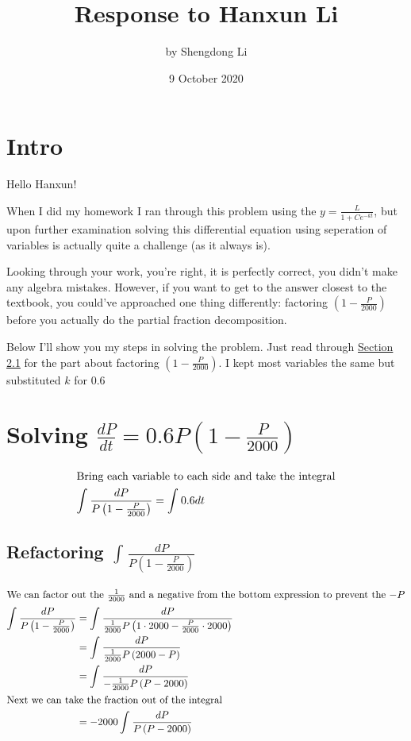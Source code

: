 \documentclass[12pt]{article}
\begin{document}
\title{Response to Hanxun Li}
\author{by Shengdong Li}
\date{9 October 2020}
\maketitle

\section{Intro}
Hello Hanxun!

When I did my homework I ran through this problem using the $y=\frac{L}{1+Ce^{-kt}}$, but upon further examination solving this differential equation using seperation of variables is actually quite a challenge (as it always is).

Looking through your work, you're right, it is perfectly correct, you didn't make any algebra mistakes. However, if you want to get to the answer closest to the textbook, you could've approached one thing differently: factoring $\left(1-\frac{P}{2000}\right)$ before you actually do the partial fraction decomposition.

Below I'll show you my steps in solving the problem. Just read through \hyperref[eq:test]{Section 2.1} for the part about factoring $\left(1-\frac{P}{2000}\right)$. I kept most variables the same but substituted $k$ for $0.6$

\section{Solving \texorpdfstring{$\frac{dP}{dt}=0.6P\left(1-\frac{P}{2000}\right)$}{Lg}}

\begin{align}
  \intertext{Bring each variable to each side and take the integral}
  \int_{ }^{ }\frac{dP}{P\left(1-\frac{P}{2000}\right)} & =\int_{ }^{ }0.6dt
\end{align}
\subsection{\textbf{Refactoring \texorpdfstring{$\int_{ }^{ }\frac{dP}{P\left(1-\frac{P}{2000}\right)}$}{Lg}}}\label{eq:test}
\begin{align}
  \intertext{We can factor out the $\frac{1}{2000}$ and a negative from the bottom expression to prevent the $-P$}
  \int_{ }^{ }\frac{dP}{P\left(1-\frac{P}{2000}\right)}
   & =\int_{ }^{ }\frac{dP}{\frac{1}{2000}P\left(1\cdot2000-\frac{P}{2000}\cdot2000\right)} \\
   & =\int_{ }^{ }\frac{dP}{\frac{1}{2000}P\left(2000-P\right)}                             \\
   & =\int_{ }^{ }\frac{dP}{-\frac{1}{2000}P\left(P-2000\right)}                            \\
  \intertext{Next we can take the fraction out of the integral}
   & =-2000\int_{ }^{ }\frac{dP}{P\left(P-2000\right)}
\end{align}
\end{document}
